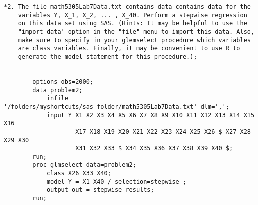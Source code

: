 \documentclass[11pt]{article}
\begin{document}
\begin{Verbatim}
*2. The file math5305Lab7Data.txt contains data contains data for the 
	variables Y, X_1, X_2, ... , X_40. Perform a stepwise regression 
	on this data set using SAS. (Hints: It may be helpful to use the 
	"import data' option in the "file" menu to import this data. Also, 
	make sure to specify in your glemselect procedure which variables 
	are class variables. Finally, it may be convenient to use R to 
	generate the model statement for this procedure.);


		options obs=2000;
		data problem2;
		    infile '/folders/myshortcuts/sas_folder/math5305Lab7Data.txt' dlm=',';
		    input Y X1 X2 X3 X4 X5 X6 X7 X8 X9 X10 X11 X12 X13 X14 X15 X16
		    		X17 X18 X19 X20 X21 X22 X23 X24 X25 X26 $ X27 X28 X29 X30
		    		X31 X32 X33 $ X34 X35 X36 X37 X38 X39 X40 $;
		run;
		proc glmselect data=problem2;
			class X26 X33 X40;
			model Y = X1-X40 / selection=stepwise ;
			output out = stepwise_results;
		run;


\end{Verbatim}

\end{document}
